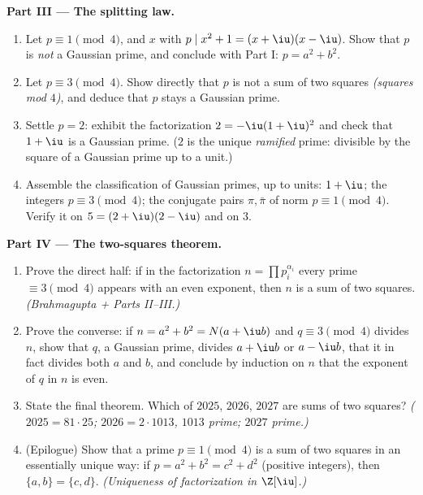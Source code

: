 \begin{problem}
\medskip
\noindent\textbf{Part III --- The splitting law.}
\begin{enumerate}[resume]
  \item Let $p \equiv 1 \pmod 4$, and $x$ with $p \mid x^2 + 1 =
        (x + \iu)(x - \iu)$. Show that $p$ is \emph{not} a
        Gaussian prime, and conclude with Part I: $p = a^2 + b^2$.
  \item Let $p \equiv 3 \pmod 4$. Show directly that $p$ is not a
        sum of two squares \emph{(squares mod $4$)}, and deduce
        that $p$ stays a Gaussian prime.
  \item Settle $p = 2$: exhibit the factorization $2 =
        -\iu(1+\iu)^2$ and check that $1 + \iu$ is a Gaussian
        prime. ($2$ is the unique \emph{ramified} prime: divisible
        by the square of a Gaussian prime up to a unit.)
  \item Assemble the classification of Gaussian primes, up to
        units: $1 + \iu$; the integers $p \equiv 3 \pmod 4$; the
        conjugate pairs $\pi, \bar\pi$ of norm $p \equiv 1 \pmod
        4$. Verify it on $5 = (2+\iu)(2-\iu)$ and on $3$.
\end{enumerate}

\medskip
\noindent\textbf{Part IV --- The two-squares theorem.}
\begin{enumerate}[resume]
  \item Prove the direct half: if in the factorization $n =
        \prod p_i^{\alpha_i}$ every prime $\equiv 3 \pmod 4$
        appears with an even exponent, then $n$ is a sum of two
        squares. \emph{(Brahmagupta + Parts II--III.)}
  \item Prove the converse: if $n = a^2 + b^2 = N(a + \iu b)$ and
        $q \equiv 3 \pmod 4$ divides $n$, show that $q$, a
        Gaussian prime, divides $a + \iu b$ or $a - \iu b$, that
        it in fact divides both $a$ and $b$, and conclude by
        induction on $n$ that the exponent of $q$ in $n$ is even.
  \item State the final theorem. Which of $2025$, $2026$, $2027$
        are sums of two squares? \emph{($2025 = 81 \cdot 25$;
        $2026 = 2 \cdot 1013$, $1013$ prime; $2027$ prime.)}
  \item (Epilogue) Show that a prime $p \equiv 1 \pmod 4$ is a
        sum of two squares in an essentially unique way: if $p =
        a^2 + b^2 = c^2 + d^2$ (positive integers), then $\{a, b\}
        = \{c, d\}$. \emph{(Uniqueness of factorization in
        $\Z[\iu]$.)}
\end{enumerate}


\end{problem}
